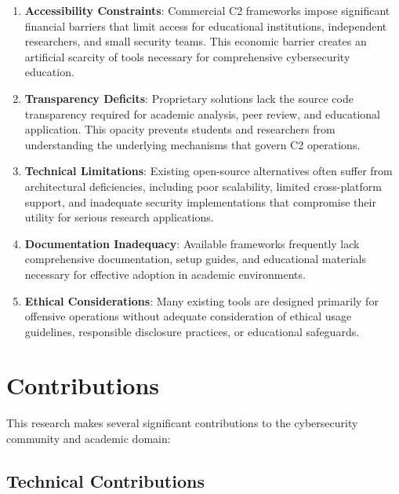 \begin{enumerate}

\item \textbf{Accessibility Constraints}: Commercial C2 frameworks impose significant financial barriers that limit access for educational institutions, independent researchers, and small security teams. This economic barrier creates an artificial scarcity of tools necessary for comprehensive cybersecurity education.

\item \textbf{Transparency Deficits}: Proprietary solutions lack the source code transparency required for academic analysis, peer review, and educational application. This opacity prevents students and researchers from understanding the underlying mechanisms that govern C2 operations.

\item \textbf{Technical Limitations}: Existing open-source alternatives often suffer from architectural deficiencies, including poor scalability, limited cross-platform support, and inadequate security implementations that compromise their utility for serious research applications.

\item \textbf{Documentation Inadequacy}: Available frameworks frequently lack comprehensive documentation, setup guides, and educational materials necessary for effective adoption in academic environments.

\item \textbf{Ethical Considerations}: Many existing tools are designed primarily for offensive operations without adequate consideration of ethical usage guidelines, responsible disclosure practices, or educational safeguards.
\end{enumerate}

\section{Contributions}
\label{sec:contributions}

This research makes several significant contributions to the cybersecurity community and academic domain:

\subsection{Technical Contributions}


